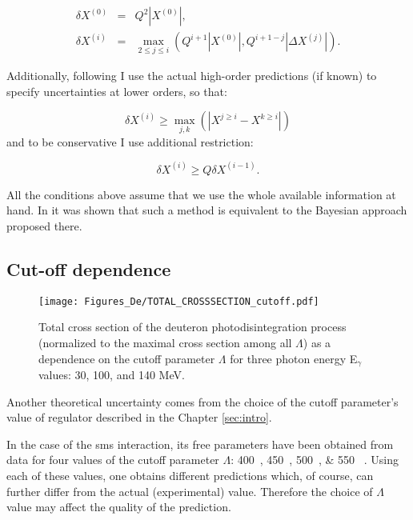     \begin{eqnarray}
        \delta X^{(0)} &=& Q^2 \left| X^{(0)} \right| \label{trunc2},\\ 
        \delta X^{(i)} &=& \max_{2 \leq j \leq i} \left( Q^{i+1} \left| X^{(0)} \right|,
        Q^{i+1-j} \left| \Delta X^{(j)} \right| \right). \label{trunc3} 
    \end{eqnarray}

    Additionally, following \cite{Binder2015} I use the actual high-order predictions 
    (if known) to specify uncertainties at lower orders, so that:

    \begin{equation}
        \delta X^{(i)} \geq \max_{j,k} (|X^{j \geq i} - X^{k \geq i}|)
        \label{trunc4}
    \end{equation}
    and to be conservative I use additional restriction:

    \begin{equation}
        \delta X^{(i)} \geq Q \delta X^{(i-1)}.
        \label{trunc5}
    \end{equation}

    All the conditions above assume that we use the whole available information at hand.
    In \cite{Melendez_BayesTrunc} it was shown that such a method is equivalent
    to the Bayesian approach proposed there.


    \subsection*{Cut-off dependence}



    \begin{figure}[htb]
        \begin{center}
            \texttt{[image: Figures\_De/TOTAL\_CROSSSECTION\_cutoff.pdf]}
        \end{center}
        \caption{Total cross section of the deuteron photodisintegration
        process (normalized to the maximal cross section among all $\Lambda$)
        as a dependence on the cutoff parameter $\Lambda$ 
        for three photon energy E$_\gamma$ values: 30, 100, and 140 MeV.}
        \label{Cutoff_dep}
        \end{figure}

    Another theoretical uncertainty comes from the choice of the cutoff parameter's value 
    of regulator described in the Chapter \ref{sec:intro}.

    In the case of the \gls{sms} interaction, its free parameters have been obtained from data for 
   four values of the cutoff parameter $\Lambda$:
   \SIlist[list-units = single]{400;450;500;550}{\mev} \cite{reinkrebs2018}.
   Using each of these values, one obtains different predictions which, of course, can further differ 
   from the actual (experimental) value. Therefore the choice of $\Lambda$ value
   may affect the quality of the prediction.

